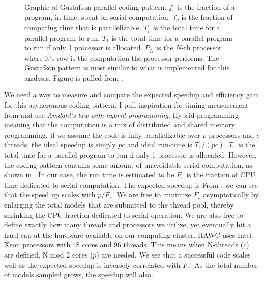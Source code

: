 \begin{figure}[h]
    \caption{Graphic of Gustafson parallel coding pattern. $f_s$ is the fraction of a program, in time, spent on serial computation. $f_p$ is the fraction of computing time that is parallelizable. $T_p$ is the total time for a parallel program to run. $T_1$ is the total time for a parallel program to run if only 1 processor is allocated. $P_N$ is the $N$-th processor where it's row is the computation the processor performs. The Gustafson pattern is most similar to what is implemented for this analysis. Figure is pulled from \cite{ArtofHPC}.}
    \label{fig:mtd_gufsta}
\end{figure}

We need a way to measure and compare the expected speedup and efficiency gain for this asyncronous coding pattern.
I pull inspiration for timing measurement from \cite{ArtofHPC} and use \textit{Amdahl's law with hybrid programming}.
Hybrid programming meaning that the computation is a mix of distributed and shared memory programming.
If we assume the code is fully parallelizable over $p$ processors and $c$ threads, the ideal speedup is simply $pc$ and ideal run-time is $T_1/(pc)$.
$T_1$ is the total time for a parallel program to run if only 1 processor is allocated.
However, the coding pattern contains some amount of unavoidable serial computation, as shown in .
In our case, the run time is estimated to be
\amdahl
$F_s$ is the fraction of CPU time dedicated to serial computation.
The expected speedup is
\amdahlSpeed
From , we can see that the speed up scales with $p/F_s$.
We are free to minimize $F_s$ asymptotically by enlarging the total models that are submitted to the thread pool, thereby shrinking the CPU fraction dedicated to serial operation.
We are also free to define exactly how many threads and processors we utilize, yet eventually hit a hard cap at the hardware available on our computing cluster.
HAWC uses Intel Xeon processors with 48 cores and 96 threads.
This means when N-threads ($c$) are defined, N mod 2 cores ($p$) are needed.
We see that a successful code scales well as the expected speedup is inversely correlated with $F_s$.
As the total number of models sampled grows, the speedup will also.

